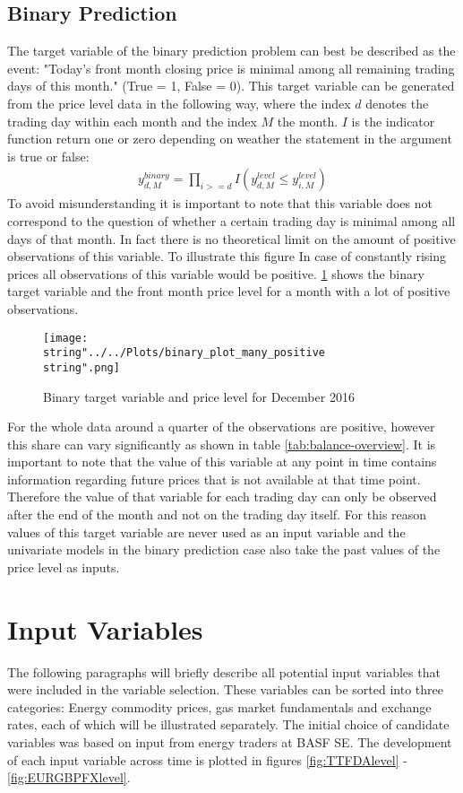 \subsection{Binary Prediction}
The target variable of the binary prediction problem can best be described as the event: "Today's front month closing price is minimal among all remaining trading days of this month." (True = 1, False = 0). This target variable can be generated from the price level data in the following way, where the index $d$ denotes the trading day within each month and the index $M$ the month. $I$ is the indicator function return one or zero depending on weather the statement in the argument is true or false:
\begin{align*}
y_{d,M}^{binary} = \prod_{i >= d} I(y_{d,M}^{level} \leq y_{i,M}^{level})
\end{align*}
To avoid misunderstanding it is important to note that this variable does not correspond to the question of whether a certain trading day is minimal among all days of that month. In fact there is no theoretical limit on the amount of positive observations of this variable. To illustrate this figure 
In case of constantly rising prices all observations of this variable would be positive.
\ref{fig:binary_plot_many_positive} shows the binary target variable and the front month price level for a month with a lot of positive observations.
\begin{figure}[h!]
  \centering
\texttt{[image: \\string"../../Plots/binary\_plot\_many\_positive\\string".png]}
  \caption{Binary target variable and price level for December 2016}\label{fig:binary_plot_many_positive}
\end{figure}
For the whole data around a quarter of the observations are positive, however this share can vary significantly as shown in table \ref{tab:balance-overview}. It is important to note that the value of this variable at any point in time contains information regarding future prices that is not available at that time point. Therefore the value of that variable for each trading day can only be observed after the end of the month and not on the trading day itself. For this reason values of this target variable are never used as an input variable and the univariate models in the binary prediction case also take the past values of the price level as inputs.

\section{Input Variables}\label{Sec:Input}
The following paragraphs will briefly describe all potential input variables that were included in the variable selection. These variables can be sorted into three categories: Energy commodity prices, gas market fundamentals and exchange rates, each of which will be illustrated separately. The initial choice of candidate variables was based on input from energy traders at BASF SE. The development of each input variable across time is plotted in figures  \ref{fig:TTFDAlevel} - \ref{fig:EURGBPFXlevel}.
